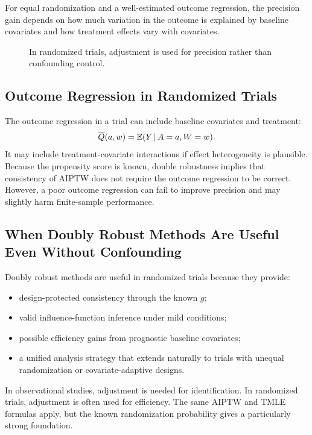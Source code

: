 For equal randomization and a well-estimated outcome regression, the precision gain
depends on how much variation in the outcome is explained by baseline covariates and
how treatment effects vary with covariates.

\begin{figure}[H]
\centering
{}
\caption{In randomized trials, adjustment is used for precision rather than confounding control.}
\label{fig:ch7-trial-adjustment}
\end{figure}

\subsection{Outcome Regression in Randomized Trials}

The outcome regression in a trial can include baseline covariates and treatment:
\[
\overline{Q}(a,w)=\mathbb{E}(Y\,\vert\, A=a,W=w).
\]
It may include treatment-covariate interactions if effect heterogeneity is plausible.
Because the propensity score is known, double robustness implies that consistency of
AIPTW does not require the outcome regression to be correct. However, a poor outcome
regression can fail to improve precision and may slightly harm finite-sample
performance.

\subsection{When Doubly Robust Methods Are Useful Even Without Confounding}

Doubly robust methods are useful in randomized trials because they provide:
\begin{itemize}
\item design-protected consistency through the known $g$;
\item valid influence-function inference under mild conditions;
\item possible efficiency gains from prognostic baseline covariates;
\item a unified analysis strategy that extends naturally to trials with unequal
randomization or covariate-adaptive designs.
\end{itemize}

\begin{keyidea}
In observational studies, adjustment is needed for identification. In randomized
trials, adjustment is often used for efficiency. The same AIPTW and TMLE formulas
apply, but the known randomization probability gives a particularly strong foundation.
\end{keyidea}
